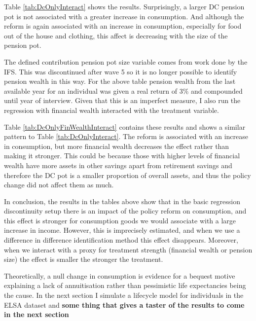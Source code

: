 \documentclass[12pt]{article}
\begin{document}
Table \ref{tab:DcOnlyInteract} shows the results. Surprisingly, a larger DC pension
pot is not associated with a greater increase in consumption. And although the reform is again associated with an
increase in consumption, especially for food out of the house and clothing, this affect is decreasing with the
size of the pension pot.


The defined contribution pension pot size variable comes from work done by the IFS. This was discontinued
after wave 5 so it is no longer possible to identify pension wealth in this way. For the above table pension
wealth from the last available year for an individual was given a real return of 3\% and compounded until year of interview.
Given that this is an imperfect measure, I also run the regression with financial wealth interacted with the treatment variable.

\begin{landscape}
    
\end{landscape}

Table \ref{tab:DcOnlyFinWealthInteract} contains these results and shows a similar pattern to Table \ref{tab:DcOnlyInteract}.
The reform is associated with an increase in consumption, but more financial wealth decreases the effect rather
than making it stronger. This could be because those with higher levels of financial wealth have more assets in
other savings apart from retirement savings \cite{cribb_karjalainen_ifs_2023} and therefore the DC pot is a smaller proportion of overall assets,
and thus the policy change did not affect them as much.

In conclusion, the results in the tables above show that in the basic regression discontinuity setup there is
an impact of the policy reform on consumption, and this effect is stronger for consumption goods we
would associate with a large increase in income. However, this is imprecisely estimated, and when we use a
difference in difference identification method this effect disappears. Moreover, when we interact with a proxy for treatment strength
(financial wealth or pension size) the effect is smaller the stronger the treatment.

Theoretically, a null change in consumption is evidence for a bequest motive explaining a lack of annuitisation
rather than pessimistic life expectancies being the cause. In the next section I simulate a lifecycle model
for individuals in the ELSA dataset and
\textbf{some thing that gives a taster of the results to come in the next section}
\end{document}
